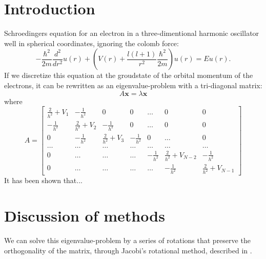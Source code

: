 \documentclass[a4paper]{article}
\begin{document}
\section{Introduction}\label{sec:intro}
Schroedingers equation for an electron in a three-dimentional harmonic oscillator well in spherical coordinates, ignoring the colomb force:
\begin{equation}
  -\frac{\hbar^2}{2 m} \frac{d^2}{dr^2} u(r) 
       + \left ( V(r) + \frac{l (l + 1)}{r^2}\frac{\hbar^2}{2 m}
                                    \right ) u(r)  = E u(r) .
\end{equation}
If we discretize this equation at the groudstate of the orbital momentum of the electrons, it can be rewritten as an eigenvalue-problem with a tri-diagonal matrix:
\begin{equation*}
A\textbf{x} = \lambda \textbf{x}
\end{equation*}
where
\begin{equation*}
A = \begin{bmatrix} \frac{2}{h^2}+V_1 & -\frac{1}{h^2} & 0   & 0    & \dots  &0     & 0 \\
                                -\frac{1}{h^2} & \frac{2}{h^2}+V_2 & -\frac{1}{h^2} & 0    & \dots  &0     &0 \\
                                0   & -\frac{1}{h^2} & \frac{2}{h^2}+V_3 & -\frac{1}{h^2}  &0       &\dots & 0\\
                                \dots  & \dots & \dots & \dots  &\dots      &\dots & \dots\\
                                0   & \dots & \dots & \dots  &-\frac{1}{h^2}  &\frac{2}{h^2}+V_{N-2} & -\frac{1}{h^2}\\
                                0   & \dots & \dots & \dots  &\dots       &-\frac{1}{h^2} & \frac{2}{h^2}+V_{N-1}
             \end{bmatrix}
\end{equation*}
It has been shown \cite{mhj_lecture_notes} that...

\section{Discussion of methods}\label{sec:methods}
We can solve this eigenvalue-problem by a series of rotations that preserve the orthogonality of the matrix, through Jacobi's rotational method, described in \cite{mhj_lecture_notes}.
\end{document}
